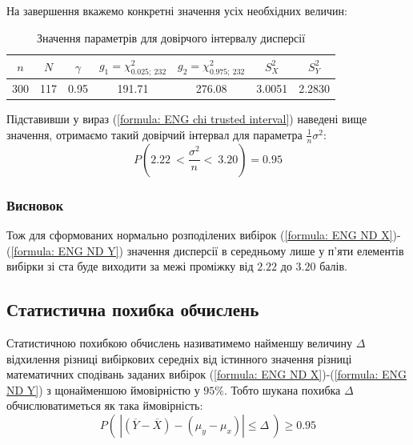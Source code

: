 На завершення вкажемо конкретні значення усіх необхідних величин:

\vspace{0.8cm}
\begin{table}[H]
    \begin{center}
        \begin{tabular}{||c|c|c|c|c|c|c||}
            \hline
            $n$ & $N$ & $\gamma$ & $g_1=\chi^2_{0.025;\ 232}$ & $g_2=\chi^2_{0.975;\ 232}$ & $S_X^2$ & $S_Y^2$ \\
            \hline \hline
            300 & 117 & 0.95 & 191.71 & 276.08 & 3.0051 & 2.2830 \\
            \hline
        \end{tabular}
        \caption{Значення параметрів для довірчого інтервалу дисперсії}
        \label{table: ENG chi interval}
    \end{center}
\end{table}

Підставивши у вираз (\ref{formula: ENG chi trusted interval}) наведені вище значення, отримаємо 
такий довірчий інтервал для параметра $\frac{1}{n}\sigma^2:$
\begin{equation*}
    P(2.22\ < \frac{\sigma^2}{n} <\ 3.20)=0.95
\end{equation*}

\subsubsection{Висновок}

Тож для сформованих нормально розподілених вибірок (\ref{formula: ENG ND X})-(\ref{formula: ENG ND Y}) 
значення дисперсії в середньому лише у п'яти елементів вибірки зі ста буде виходити за межі проміжку від 
$2.22$ до $3.20$ балів.

\subsection{Статистична похибка обчислень}
\label{page: ENG percentage point}

Статистичною похибкою обчислень називатимемо найменшу величину $\Delta$ відхилення різниці вибіркових 
середніх від істинного значення різниці математичних сподівань заданих вибірок 
(\ref{formula: ENG ND X})-(\ref{formula: ENG ND Y}) з щонайменшою ймовірністю у $95\%$. 
Тобто шукана похибка $\Delta$ обчислюватиметься як така ймовірність:
\begin{equation*}
    P\left(\ \left| (\overline{Y}-\overline{X})-(\mu_y-\mu_x) \right| \leqslant \Delta\ \right)\geqslant 0.95
\end{equation*}

